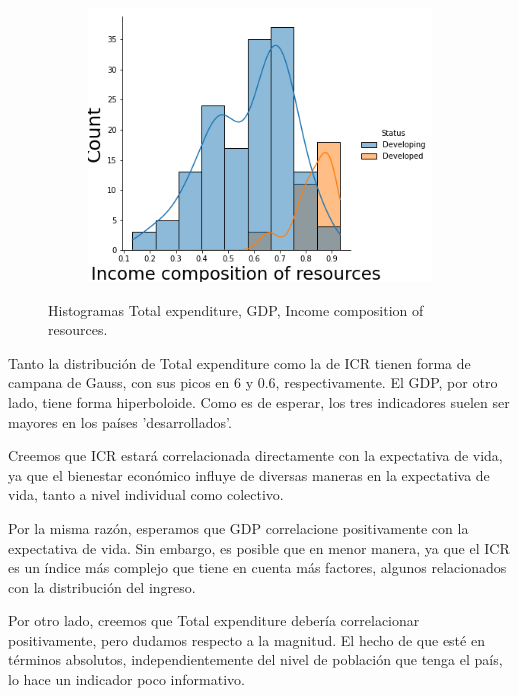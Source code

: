 \begin{itemize}
\begin{figure}[H]
                \begin{subfigure}{0.3\linewidth}
                \centering
                \includegraphics[width=\textwidth]{img/18.png}
              \end{subfigure}
               \caption{Histogramas Total expenditure, GDP, Income composition of resources.}
               \label{fig: 8}
        \end{figure}
            
            
            
            Tanto la distribución de Total expenditure como la de ICR tienen forma de campana de Gauss, con sus picos en 6 y 0.6, respectivamente. El GDP, por otro lado, tiene forma hiperboloide. Como es de esperar, los tres indicadores suelen ser mayores en los países 'desarrollados'. 
            
            Creemos que ICR estará correlacionada directamente con la expectativa de vida, ya que el bienestar económico influye de diversas maneras en la expectativa de vida, tanto a nivel individual como colectivo.
            
            Por la misma razón, esperamos que GDP correlacione positivamente con la expectativa de vida. Sin embargo, es posible que en menor manera, ya que el ICR es un índice más complejo que tiene en cuenta más factores, algunos relacionados con la distribución del ingreso. 
            
            Por otro lado, creemos que Total expenditure debería correlacionar positivamente, pero dudamos respecto a la magnitud. El hecho de que esté en términos absolutos, independientemente del nivel de población que tenga el país, lo hace un indicador poco informativo.
            

\end{itemize}
